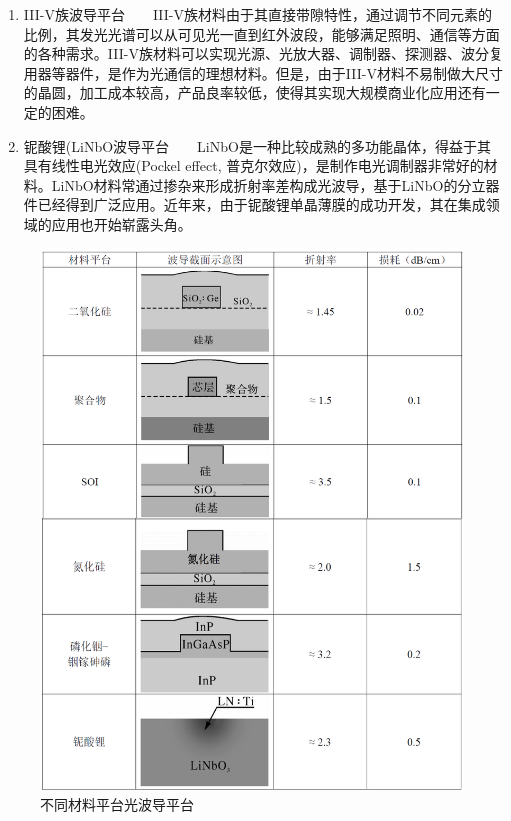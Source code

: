 \begin{enumerate}[(1)]
	\item
	III-V族波导平台~~~~III-V族材料由于其直接带隙特性，通过调节不同元素的比例，其发光光谱可以从可见光一直到红外波段，能够满足照明、通信等方面的各种需求。III-V族材料可以实现光源、光放大器、调制器、探测器、波分复用器等器件，是作为光通信的理想材料。但是，由于III-V材料不易制做大尺寸的晶圆，加工成本较高，产品良率较低，使得其实现大规模商业化应用还有一定的困难。
	\item 
	铌酸锂(LiNbO波导平台~~~~LiNbO是一种比较成熟的多功能晶体，得益于其具有线性电光效应(Pockel effect, 普克尔效应)，是制作电光调制器非常好的材料。LiNbO材料常通过掺杂来形成折射率差构成光波导，基于LiNbO的分立器件已经得到广泛应用。近年来，由于铌酸锂单晶薄膜的成功开发，其在集成领域的应用也开始崭露头角\cite{wang2018integrated,he2019high}。
\end{enumerate}

\begin{figure}[htb]
	\centering
	\includegraphics[width=13cm]{./Pictures/intro_materialplatform.jpg}
	\captionsetup{justification=centering}
	\caption{不同材料平台光波导平台\cite{hslwngzjc}}
	\label{intro_materialplatform}
\end{figure}

